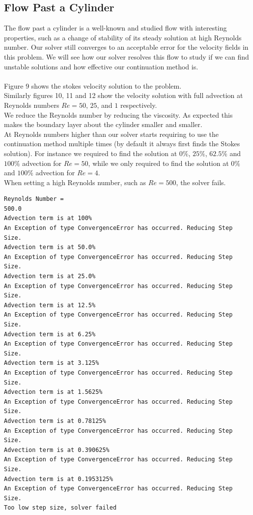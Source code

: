 \documentclass[11pt,twoside,a4paper]{article}
\begin{document}
\subsection{Flow Past a Cylinder}

The flow past a cylinder is a well-known and studied flow with interesting properties, such as a change of stability of its steady solution at high Reynolds number.
Our solver still converges to an acceptable error for the velocity fields in this problem.
We will see how our solver resolves this flow to study if we can find unstable solutions and how effective our continuation method is.\\
\\
Figure 9 shows the stokes velocity solution to the problem.\\
Similarly figures 10, 11 and 12 show the velocity solution with full advection at Reynolds numbers $Re = 50$, $25$, and $1$ respectively.\\
We reduce the Reynolds number by reducing the viscosity. As expected this makes the boundary layer about the cylinder smaller and smaller.\\
At Reynolds numbers higher than our solver starts requiring to use the continuation method multiple times (by default it always first finds the Stokes solution). For instance we required to find the solution at $0 \%$, $25 \%$, $62.5\%$ and $100\%$ advection for $Re =50$, while we only required to find the solution at $0 \%$ and $100 \%$ advection for $Re = 4 $.\\
When setting a high Reynolds number, such as $Re = 500$, the solver fails.
\begin{lstlisting}
Reynolds Number =
500.0
Advection term is at 100%
An Exception of type ConvergenceError has occurred. Reducing Step Size.
Advection term is at 50.0%
An Exception of type ConvergenceError has occurred. Reducing Step Size.
Advection term is at 25.0%
An Exception of type ConvergenceError has occurred. Reducing Step Size.
Advection term is at 12.5%
An Exception of type ConvergenceError has occurred. Reducing Step Size.
Advection term is at 6.25%
An Exception of type ConvergenceError has occurred. Reducing Step Size.
Advection term is at 3.125%
An Exception of type ConvergenceError has occurred. Reducing Step Size.
Advection term is at 1.5625%
An Exception of type ConvergenceError has occurred. Reducing Step Size.
Advection term is at 0.78125%
An Exception of type ConvergenceError has occurred. Reducing Step Size.
Advection term is at 0.390625%
An Exception of type ConvergenceError has occurred. Reducing Step Size.
Advection term is at 0.1953125%
An Exception of type ConvergenceError has occurred. Reducing Step Size.
Too low step size, solver failed
\end{lstlisting}
\end{document}

